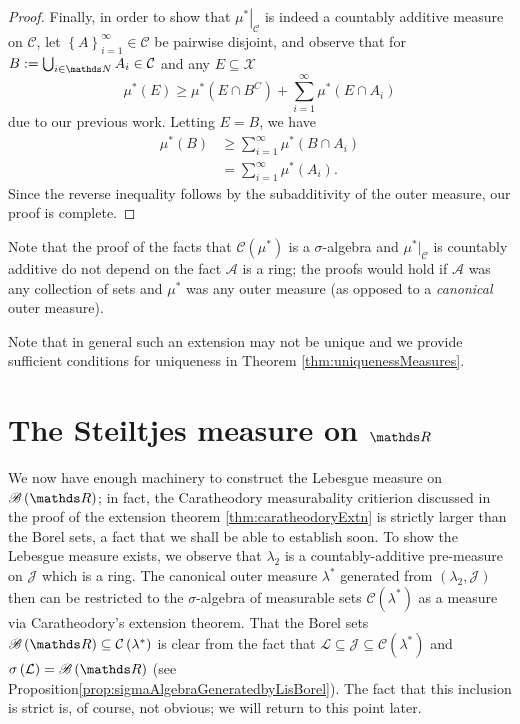 \begin{proof}
Finally, in order to show that $\left.\mu^{*}\right|_{\mathcal{C}}$
is indeed a countably additive measure on $\mathcal{C}$, let $\left\{ A\right\} _{i=1}^{\infty}\in\mathcal{C}$
be pairwise disjoint, and observe that for $B:=\bigcup_{i\in\N}A_{i}\in\mathcal{C}$
and any $E\subseteq\mathcal{X}$
\[
\mu^{*}\left(E\right)\geq\mu^{*}\left(E\cap B^{C}\right)+\sum_{i=1}^{\infty}\mu^{*}\left(E\cap A_{i}\right)
\]
due to our previous work. Letting $E=B$, we have 
\begin{align*}
\mu^{*}\left(B\right) & \geq\sum_{i=1}^{\infty}\mu^{*}\left(B\cap A_{i}\right)\\
 & =\sum_{i=1}^{\infty}\mu^{*}\left(A_{i}\right).
\end{align*}
Since the reverse inequality follows by the subadditivity of the outer
measure, our proof is complete.
\end{proof}
\begin{rem}
\label{rem:noRingReqd}Note that the proof of the facts that $\mathcal{C}\left(\mu^{*}\right)$
is a $\sigma$-algebra and $\mu^{*}|_{\mathcal{C}}$ is countably
additive do not depend on the fact $\mathcal{A}$ is a ring; the proofs
would hold if $\mathcal{A}$ was any collection of sets and $\mu^{*}$
was any outer measure (as opposed to a \emph{canonical }outer measure).
\end{rem}

Note that in general such an extension may not be unique and we provide
sufficient conditions for uniqueness in Theorem \ref{thm:uniquenessMeasures}.

\section{The Steiltjes measure on $\protect\R$}

We now have enough machinery to construct the Lebesgue measure on
$\borel\left(\R\right)$; in fact, the Caratheodory measurabality
critierion discussed in the proof of the extension theorem \ref{thm:caratheodoryExtn}
is strictly larger than the Borel sets, a fact that we shall be able
to establish soon. To show the Lebesgue measure exists, we observe
that $\lambda_{2}$ is a countably-additive pre-measure on $\mathcal{J}$
which is a ring. The canonical outer measure $\lambda^{*}$ generated
from $\left(\lambda_{2},\mathcal{J}\right)$ then can be restricted
to the $\sigma$-algebra of measurable sets $\mathcal{C}\left(\lambda^{*}\right)$
as a measure via Caratheodory's extension theorem. That the Borel
sets $\borel\left(\R\right)\subseteq\mathcal{C}\left(\lambda^{*}\right)$
is clear from the fact that $\mathcal{L}\subseteq\mathcal{\mathcal{J}\subseteq C}\left(\lambda^{*}\right)$
and $\sigma\left(\mathcal{L}\right)=\borel\left(\R\right)$ (see Proposition\ref{prop:sigmaAlgebraGeneratedbyLisBorel}).
The fact that this inclusion is strict is, of course, not obvious;
we will return to this point later.

